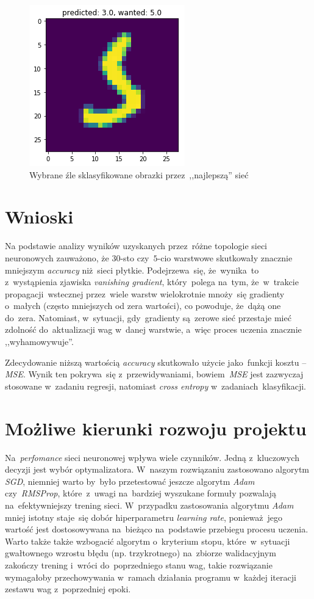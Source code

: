 \documentclass[11pt, a4paper]{article}
\begin{document}
\begin{figure}[H]
		\includegraphics[scale=0.5]{wrong_class_3.png}
		\caption{Wybrane źle sklasyfikowane obrazki przez~,,najlepszą'' sieć}
\end{figure}


 \section {Wnioski}
 Na podstawie analizy wyników uzyskanych przez~różne topologie sieci neuronowych zauważono, że $30$-sto czy~$5$-cio warstwowe skutkowały znacznie mniejszym \textit{accuracy}
 niż~sieci płytkie. Podejrzewa~się, że~wynika~to z~wystąpienia zjawiska \textit{vanishing gradient}, który~polega na~tym, że~w~trakcie propagacji~wstecznej przez~wiele warstw
 wielokrotnie mnoży~się gradienty o~małych (często mniejszych od zera wartości), co powoduje, że~dążą one do~zera. Natomiast, w~sytuacji, gdy~gradienty są~zerowe sieć przestaje
 mieć zdolność do~aktualizacji wag w~danej warstwie, a~więc proces uczenia znacznie ,,wyhamowywuje''. 
 
Zdecydowanie niższą wartością \textit{accuracy} skutkowało użycie jako~funkcji kosztu -- \textit{MSE}. Wynik ten pokrywa~się z~przewidywaniami, bowiem~\textit{MSE}
jest zazwyczaj stosowane w~zadaniu regresji, natomiast \textit{cross entropy} w~zadaniach~klasyfikacji. 


 
 \section {Możliwe kierunki rozwoju projektu}
 Na~\textit{perfomance} sieci neuronowej wpływa wiele czynników. Jedną z~kluczowych decyzji jest wybór optymalizatora. W~naszym rozwiązaniu
 zastosowano algorytm \textit{SGD}, niemniej warto by~było przetestować jeszcze algorytm \textit{Adam} czy~\textit{RMSProp},
 które~z~uwagi na~bardziej wyszukane formuły pozwalają na~efektywniejszy trening sieci. W~przypadku zastosowania algorytmu \textit{Adam} mniej istotny staje~się dobór
 hiperparametru \textit{learning rate}, ponieważ~jego wartość jest dostosowywana na~bieżąco na~podstawie przebiegu procesu uczenia. 
 Warto także także wzbogacić algorytm o~kryterium stopu, które~w~sytuacji gwałtownego wzrostu błędu (np. trzykrotnego) na~zbiorze walidacyjnym zakończy trening i~wróci do~poprzedniego stanu wag,
 takie rozwiązanie wymagałoby przechowywania w~ramach działania programu w~każdej iteracji zestawu wag z~poprzedniej epoki.
 
\end{document}
